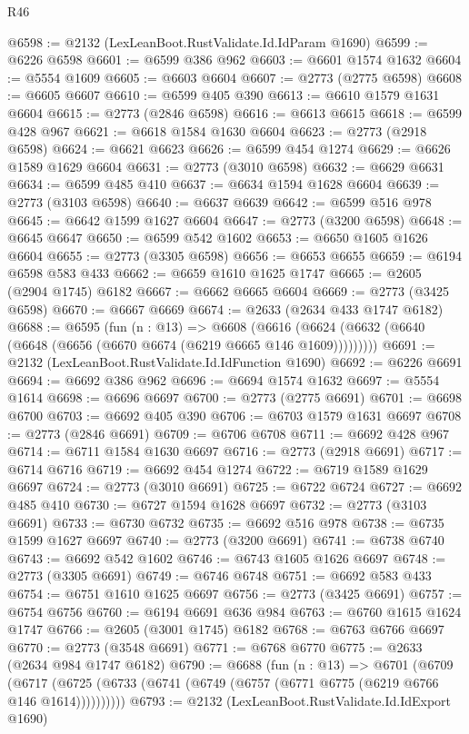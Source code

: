 \begin{lexlean}{R46}
\begin{coremodule}
@6598 := @2132 (LexLeanBoot.RustValidate.Id.IdParam @1690)
@6599 := @6226 @6598
@6601 := @6599 @386 @962
@6603 := @6601 @1574 @1632
@6604 := @5554 @1609
@6605 := @6603 @6604
@6607 := @2773 (@2775 @6598)
@6608 := @6605 @6607
@6610 := @6599 @405 @390
@6613 := @6610 @1579 @1631 @6604
@6615 := @2773 (@2846 @6598)
@6616 := @6613 @6615
@6618 := @6599 @428 @967
@6621 := @6618 @1584 @1630 @6604
@6623 := @2773 (@2918 @6598)
@6624 := @6621 @6623
@6626 := @6599 @454 @1274
@6629 := @6626 @1589 @1629 @6604
@6631 := @2773 (@3010 @6598)
@6632 := @6629 @6631
@6634 := @6599 @485 @410
@6637 := @6634 @1594 @1628 @6604
@6639 := @2773 (@3103 @6598)
@6640 := @6637 @6639
@6642 := @6599 @516 @978
@6645 := @6642 @1599 @1627 @6604
@6647 := @2773 (@3200 @6598)
@6648 := @6645 @6647
@6650 := @6599 @542 @1602
@6653 := @6650 @1605 @1626 @6604
@6655 := @2773 (@3305 @6598)
@6656 := @6653 @6655
@6659 := @6194 @6598 @583 @433
@6662 := @6659 @1610 @1625 @1747
@6665 := @2605 (@2904 @1745) @6182
@6667 := @6662 @6665 @6604
@6669 := @2773 (@3425 @6598)
@6670 := @6667 @6669
@6674 := @2633 (@2634 @433 @1747 @6182)
@6688 := @6595
    (fun (n : @13) =>
    @6608 (@6616 (@6624 (@6632 (@6640 (@6648 (@6656 (@6670 @6674 (@6219 @6665 @146 @1609)))))))))
@6691 := @2132 (LexLeanBoot.RustValidate.Id.IdFunction @1690)
@6692 := @6226 @6691
@6694 := @6692 @386 @962
@6696 := @6694 @1574 @1632
@6697 := @5554 @1614
@6698 := @6696 @6697
@6700 := @2773 (@2775 @6691)
@6701 := @6698 @6700
@6703 := @6692 @405 @390
@6706 := @6703 @1579 @1631 @6697
@6708 := @2773 (@2846 @6691)
@6709 := @6706 @6708
@6711 := @6692 @428 @967
@6714 := @6711 @1584 @1630 @6697
@6716 := @2773 (@2918 @6691)
@6717 := @6714 @6716
@6719 := @6692 @454 @1274
@6722 := @6719 @1589 @1629 @6697
@6724 := @2773 (@3010 @6691)
@6725 := @6722 @6724
@6727 := @6692 @485 @410
@6730 := @6727 @1594 @1628 @6697
@6732 := @2773 (@3103 @6691)
@6733 := @6730 @6732
@6735 := @6692 @516 @978
@6738 := @6735 @1599 @1627 @6697
@6740 := @2773 (@3200 @6691)
@6741 := @6738 @6740
@6743 := @6692 @542 @1602
@6746 := @6743 @1605 @1626 @6697
@6748 := @2773 (@3305 @6691)
@6749 := @6746 @6748
@6751 := @6692 @583 @433
@6754 := @6751 @1610 @1625 @6697
@6756 := @2773 (@3425 @6691)
@6757 := @6754 @6756
@6760 := @6194 @6691 @636 @984
@6763 := @6760 @1615 @1624 @1747
@6766 := @2605 (@3001 @1745) @6182
@6768 := @6763 @6766 @6697
@6770 := @2773 (@3548 @6691)
@6771 := @6768 @6770
@6775 := @2633 (@2634 @984 @1747 @6182)
@6790 := @6688
    (fun (n : @13) =>
    @6701
      (@6709
        (@6717 (@6725 (@6733 (@6741 (@6749 (@6757 (@6771 @6775 (@6219 @6766 @146 @1614))))))))))
@6793 := @2132 (LexLeanBoot.RustValidate.Id.IdExport @1690)

\end{coremodule}
\end{lexlean}
